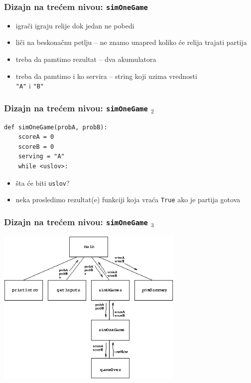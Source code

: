 \documentclass[utf8,compress,aspectratio=169]{beamer}
\begin{document}
\begin{frame}[fragile]
  \frametitle{Dizajn na trećem nivou: \texttt{simOneGame}}
\begin{itemize}
  \item igrači igraju relije dok jedan ne pobedi
  \item liči na beskonačnu petlju -- ne znamo unapred koliko će relija trajati partija
  \item treba da pamtimo rezultat -- dva akumulatora
  \item treba da pamtimo i ko servira -- string koji uzima vrednosti \\ \texttt{"A"} i \texttt{"B"}
\end{itemize}
\end{frame}

\begin{frame}[fragile]
  \frametitle{Dizajn na trećem nivou: \texttt{simOneGame} $_2$}
\begin{verbatim}
def simOneGame(probA, probB):
    scoreA = 0
    scoreB = 0
    serving = "A"
    while <uslov>:
\end{verbatim}
\begin{itemize}
  \item šta će biti \texttt{uslov}?
  \item neka prosledimo rezultat(e) funkciji koja vraća \texttt{True} ako je partija gotova
\end{itemize}
\end{frame}

\begin{frame}
  \frametitle{Dizajn na trećem nivou: \texttt{simOneGame} $_3$}
\begin{center}
  \includegraphics[width=9cm]{pic24}
\end{center}
\end{frame}
\end{document}
